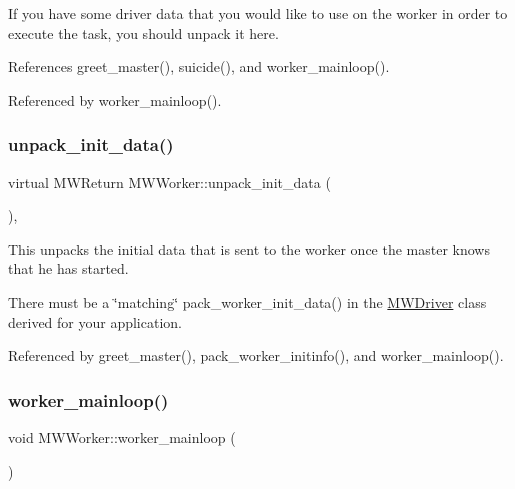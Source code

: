 If you have some driver data that you would like to use on the worker in order to execute the task, you should unpack it here. 

References greet\+\_\+master(), suicide(), and worker\+\_\+mainloop().



Referenced by worker\+\_\+mainloop().

\mbox{\label{classMWWorker_a3643c48f110d3f26e4d9aef00569d767}} 
\subsubsection{\texorpdfstring{unpack\+\_\+init\+\_\+data()}{unpack\_init\_data()}}
{\footnotesize\ttfamily virtual M\+W\+Return M\+W\+Worker\+::unpack\+\_\+init\+\_\+data (\begin{DoxyParamCaption}{ }\end{DoxyParamCaption})\hspace{0.3cm}{\ttfamily [protected]}, {}}

This unpacks the initial data that is sent to the worker once the master knows that he has started.

There must be a \char`\"{}matching\char`\"{} pack\+\_\+worker\+\_\+init\+\_\+data() in the \hyperlink{classMWDriver}{M\+W\+Driver} class derived for your application. 

Referenced by greet\+\_\+master(), pack\+\_\+worker\+\_\+initinfo(), and worker\+\_\+mainloop().

\mbox{\label{classMWWorker_a47f88c7a7c254d215174b77ab14bf5f3}} 
\subsubsection{\texorpdfstring{worker\+\_\+mainloop()}{worker\_mainloop()}}
{\footnotesize\ttfamily void M\+W\+Worker\+::worker\+\_\+mainloop (\begin{DoxyParamCaption}{ }\end{DoxyParamCaption})\hspace{0.3cm}{\ttfamily [protected]}}

